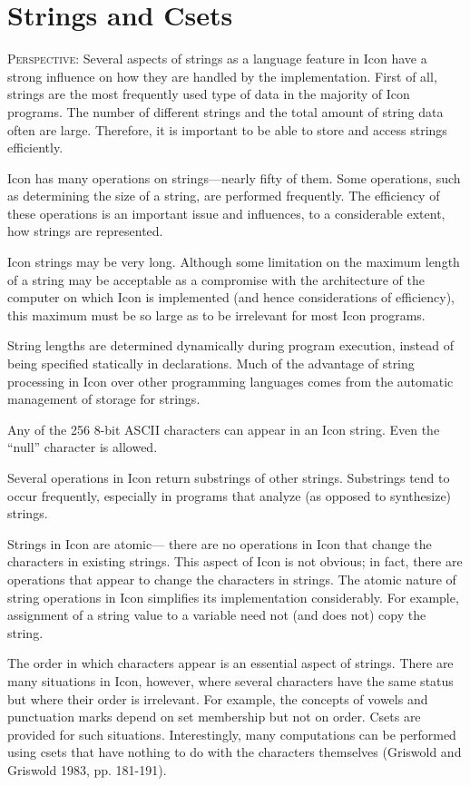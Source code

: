 \chapter{Strings and Csets}

\textsc{Perspective}: Several aspects of strings as a language feature
in Icon have a strong influence on how they are handled by the
implementation. First of all, strings are the most frequently used
type of data in the majority of Icon programs. The number of different
strings and the total amount of string data often are
large. Therefore, it is important to be able to store and access
strings efficiently.

Icon has many operations on strings{---}nearly fifty of them. Some
operations, such as determining the size of a string, are performed
frequently. The efficiency of these operations is an important issue
and influences, to a considerable extent, how strings are represented.

Icon strings may be very long. Although some limitation on the maximum
length of a string may be acceptable as a compromise with the
architecture of the computer on which Icon is implemented (and hence
considerations of efficiency), this maximum must be so large as to be
irrelevant for most Icon programs.

String lengths are determined dynamically during program execution,
instead of being specified statically in declarations. Much of the
advantage of string processing in Icon over other programming
languages comes from the automatic management of storage for strings.

Any of the 256 8-bit ASCII characters can appear in an Icon
string. Even the ``null'' character is allowed.

Several operations in Icon return substrings of other
strings. Substrings tend to occur frequently, especially in programs
that analyze (as opposed to synthesize) strings.


Strings in Icon are atomic{---} there are no operations in Icon that
change the characters in existing strings. This aspect of Icon is not
obvious; in fact, there are operations that appear to change the
characters in strings. The atomic nature of string operations in Icon
simplifies its implementation considerably. For example, assignment of
a string value to a variable need not (and does not) copy the string.

The order in which characters appear is an essential aspect of
strings. There are many situations in Icon, however, where several
characters have the same status but where their order is
irrelevant. For example, the concepts of vowels and punctuation marks
depend on set membership but not on order. Csets are provided for such
situations. Interestingly, many computations can be performed using
csets that have nothing to do with the characters themselves (Griswold
and Griswold 1983, pp. 181-191).


